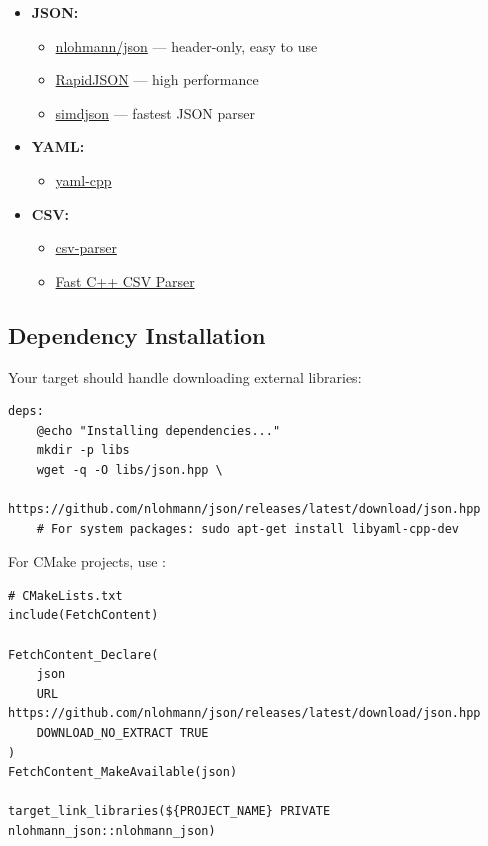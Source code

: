 \begin{itemize}
  \item \textbf{JSON:}
    \begin{itemize}
      \item \href{https://github.com/nlohmann/json}{nlohmann/json} --- header-only, easy to use
      \item \href{https://github.com/Tencent/rapidjson}{RapidJSON} --- high performance
      \item \href{https://github.com/simdjson/simdjson}{simdjson} --- fastest JSON parser
    \end{itemize}
  \item \textbf{YAML:}
    \begin{itemize}
      \item \href{https://github.com/jbeder/yaml-cpp}{yaml-cpp}
    \end{itemize}
  \item \textbf{CSV:}
    \begin{itemize}
      \item \href{https://github.com/vincentlaucsb/csv-parser}{csv-parser}
      \item \href{https://github.com/ben-strasser/fast-cpp-csv-parser}{Fast C++ CSV Parser}
    \end{itemize}
\end{itemize}

\subsection{Dependency Installation}

Your \makedeps{} target should handle downloading external libraries:

\begin{lstlisting}[style=makefile]
deps:
	@echo "Installing dependencies..."
	mkdir -p libs
	wget -q -O libs/json.hpp \
	  https://github.com/nlohmann/json/releases/latest/download/json.hpp
	# For system packages: sudo apt-get install libyaml-cpp-dev
\end{lstlisting}

For CMake projects, use :

\begin{lstlisting}[style=cpp]
# CMakeLists.txt
include(FetchContent)

FetchContent_Declare(
    json
    URL https://github.com/nlohmann/json/releases/latest/download/json.hpp
    DOWNLOAD_NO_EXTRACT TRUE
)
FetchContent_MakeAvailable(json)

target_link_libraries(${PROJECT_NAME} PRIVATE nlohmann_json::nlohmann_json)
\end{lstlisting}

